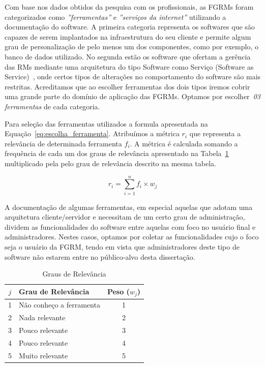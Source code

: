 Com base nos dados obtidos da pesquisa com os profissionais, as FGRMs foram
categorizados como \textit{''ferramentas''} e \textit{''serviços da internet''}
utilizando a documentação do software. A primeira categoria representa os
softwares que são capazes de serem implantados na infraestrutura do seu cliente
e permite algum grau de personalização de pelo menos um dos componentes, como
por exemplo, o banco de dados utilizado. No segunda estão os software que
ofertam a gerência das RMs mediante uma arquitetura do tipo Software como
Serviço (Software as Service)~\cite{fox2013engineering}, onde certos tipos de
alterações no comportamento do software são mais restritas. Acreditamos que ao
escolher ferramentas dos dois tipos iremos cobrir uma grande parte do domínio de
aplicação das FGRMs. Optamos por escolher~\textit{03 ferramentas} de cada
categoria.

Para seleção das ferramentas utilizados a formula apresentada na
Equação~\ref{eq:escolha_ferramenta}. Atribuímos a métrica $r_i$ que representa a
relevância de determinada ferramenta $f_i$. A métrica é calculada somando a
frequência de cada um dos graus de relevância apresentado na
Tabela~\ref{tab:graus_relevancia} multiplicado pela pelo grau de relevância
descrito na mesma tabela.

\begin{equation}
\label{eq:escolha_ferramenta}
r_i = \sum_{i=1}^{n} f_i \times w_j
\end{equation}

A documentação de algumas ferramentas, em especial aquelas que adotam uma
arquitetura cliente/servidor e necessitam de um certo grau de administração,
dividem as funcionalidades do software entre aquelas com foco no usuário final e
ad\-mi\-nis\-tra\-do\-res. Nestes casos, optamos por coletar as funcionalidades
cujo o foco seja o usuário da FGRM, tendo em vista que administradores deste
tipo de software não estarem entre no público-alvo desta dissertação.

\begin{table}[htpb]
\centering
\begin{tabular}{@{}clc@{}}
\toprule
\textbf{$j$} & \textbf{Grau de Relevância} & \textbf{Peso ($w_j$)} \\ \midrule
1 & Não conheço a ferramenta & 1 \\
2 & Nada relevante & 2 \\
3 & Pouco relevante & 3 \\
4 & Pouco relevante & 4 \\
5 & Muito relevante & 5 \\ \bottomrule
\end{tabular}
\caption{Graus de Relevância}
\label{tab:graus_relevancia}
\end{table}


